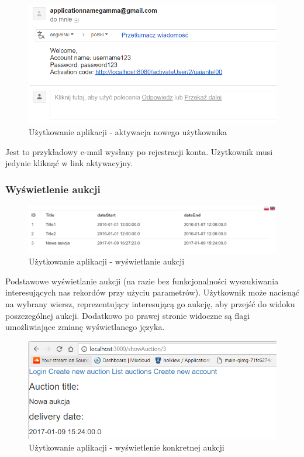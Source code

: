 \documentclass[10pt,titlepage]{article} %
\begin{document}
\begin{figure}[H]
\includegraphics[width=\textwidth]{img/sekcja4/przykladowyEmail}
\caption[Użytkowanie aplikacji - aktywacja nowego użytkownika]{Użytkowanie aplikacji - aktywacja nowego użytkownika}
\end{figure}
Jest to przykładowy e-mail wysłany po rejestracji konta. Użytkownik musi jedynie kliknąć w link aktywacyjny.

\subsubsection{Wyświetlenie aukcji}
\begin{figure}[H]
\includegraphics[width=\textwidth]{img/sekcja4/listowanieAukcji}
\caption[Użytkowanie aplikacji - wyświetlanie aukcji]{Użytkowanie aplikacji - wyświetlanie aukcji}
\end{figure}

Podstawowe wyświetlanie aukcji (na razie bez funkcjonalności wyszukiwania interesujących nas rekordów przy użyciu parametrów). Użytkownik może nacisnąć na wybrany wiersz, reprezentujący interesującą go aukcję, aby przejść do widoku poszczególnej aukcji. Dodatkowo po prawej stronie widoczne są flagi umożliwiające zmianę wyświetlanego języka.

\begin{figure}[H]
\includegraphics[width=\textwidth]{img/sekcja4/wygladAukcji}
\caption[Użytkowanie aplikacji - wyświetlenie konkretnej aukcji]{Użytkowanie aplikacji - wyświetlenie konkretnej aukcji}
\end{figure}
\end{document}
